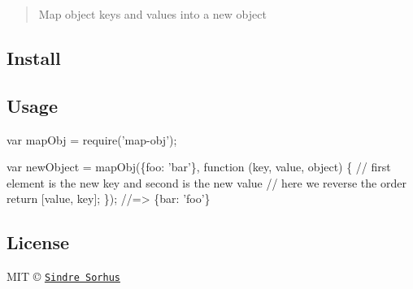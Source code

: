 \begin{quote}
Map object keys and values into a new object \end{quote}


\subsection*{Install}




\subsection*{Usage}


\begin{DoxyCode}
var mapObj = require('map-obj');

var newObject = mapObj(\{foo: 'bar'\}, function (key, value, object) \{
    // first element is the new key and second is the new value
    // here we reverse the order
    return [value, key];
\});
//=> \{bar: 'foo'\}
\end{DoxyCode}


\subsection*{License}

M\+IT © \href{http://sindresorhus.com}{\tt Sindre Sorhus} 